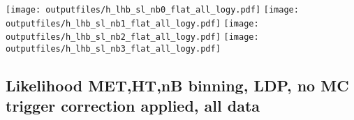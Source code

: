 \documentclass[11pt]{article}
\begin{document}
    \noindent
     \texttt{[image: outputfiles/h\_lhb\_sl\_nb0\_flat\_all\_logy.pdf]}
     \texttt{[image: outputfiles/h\_lhb\_sl\_nb1\_flat\_all\_logy.pdf]}
     \texttt{[image: outputfiles/h\_lhb\_sl\_nb2\_flat\_all\_logy.pdf]}
     \texttt{[image: outputfiles/h\_lhb\_sl\_nb3\_flat\_all\_logy.pdf]}

    \clearpage














    \subsection{ Likelihood MET,HT,nB binning, LDP, no MC trigger correction applied, all data}
\end{document}
